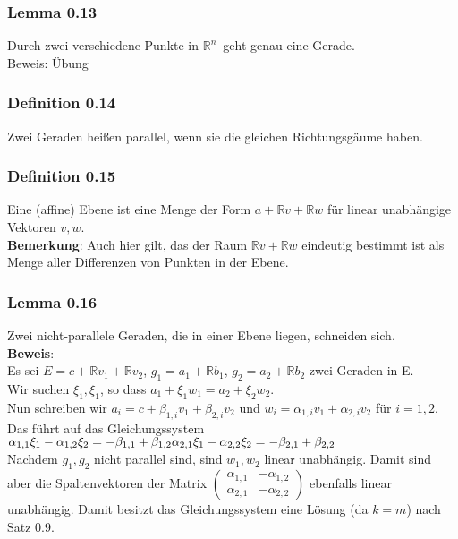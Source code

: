 \documentclass{article}
\newcommand{\R}{\mathbb{R}}
\newcommand{\mRn}{$\mathbb{R}^n$\ }
\newcommand{\al}{\alpha}
\begin{document}
\subsubsection{Lemma 0.13}
Durch zwei verschiedene Punkte in \mRn geht genau eine Gerade.\\
Beweis: Übung

\subsubsection{Definition 0.14}
Zwei Geraden hei\ss{}en parallel, wenn sie die gleichen Richtungsgäume haben.

\subsubsection{Definition 0.15}
Eine (affine) Ebene ist eine Menge der Form $a + \R v + \R w$ für linear unabhängige Vektoren $v, w$.\\
\textbf{Bemerkung}: Auch hier gilt, das der Raum $\R v + \R w$ eindeutig bestimmt ist als Menge aller Differenzen von Punkten in der Ebene.

\subsubsection{Lemma 0.16}
Zwei nicht-parallele Geraden, die in einer Ebene liegen, schneiden sich.\\
\textbf{Beweis}:\\
Es sei $E = c + \R v_1 + \R v_2$, $g_1 = a_1 + \R b_1$, $g_2 = a_2 + \R b_2$ zwei Geraden in E.\\
Wir suchen $\xi_1, \xi_1$, so dass $a_1 + \xi_1 w_1 = a_2 + \xi_2 w_2$.\\
Nun schreiben wir $a_i = c + \beta_{1,i} v_1 + \beta_{2,i} v_2$ und $w_i = \al_{1,i} v_1 + \al_{2,i} v_2$ für $i =1,2$.\\
Das führt auf das Gleichungssystem\\
$
\al_{1,1} \xi_1 - \al_{1,2} \xi_2 = - \beta_{1,1} + \beta_{1,2}\\
\al_{2,1} \xi_1 - \al_{2,2} \xi_2 = - \beta_{2,1} + \beta_{2,2}\\
$\\
Nachdem $g_1, g_2$ nicht parallel sind, sind $w_1, w_2$ linear unabhängig. Damit sind aber die Spaltenvektoren der Matrix $
\begin{pmatrix}
\al_{1,1} & -\al_{1,2}\\
\al_{2,1} & -\al_{2,2}
\end{pmatrix}
$ ebenfalls linear unabhängig. Damit besitzt das Gleichungssystem eine Lösung (da $k = m$) nach Satz 0.9.
\end{document}
